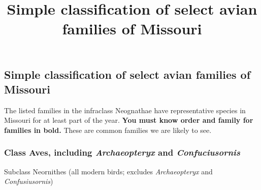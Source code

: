\documentclass[10pt]{article}
\title{Simple classification of select avian families of Missouri}
\date{}                                           %
\newlength\onelength
\begin{document}
\thispagestyle{plain}

\subsection*{Simple classification of select avian families of Missouri}

The listed families in the infraclass Neognathae have representative species in Missouri for at least part of the year. \textbf{You must know order and family for families in bold.} These are common families we are likely to see.

\subsubsection*{Class Aves, including \textit{Archaeopteryx} and \textit{Confuciusornis}}

Subclass Neornithes (all modern birds; excludes \textit{Archaeopteryx} and \textit{Confusiusornis})
\end{document}
